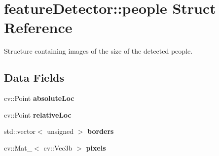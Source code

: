 \hypertarget{structfeatureDetector_1_1people}{
\section{featureDetector::people Struct Reference}
\label{structfeatureDetector_1_1people}
}


Structure containing images of the size of the detected people.  


\subsection*{Data Fields}
\begin{DoxyCompactItemize}
\item 
\hypertarget{structfeatureDetector_1_1people_aba2cb9765825865dcd2da02d3720236c}{
cv::Point {\bfseries absoluteLoc}}
\label{structfeatureDetector_1_1people_aba2cb9765825865dcd2da02d3720236c}

\item 
\hypertarget{structfeatureDetector_1_1people_a6103765384027e5d542246d09ff53abe}{
cv::Point {\bfseries relativeLoc}}
\label{structfeatureDetector_1_1people_a6103765384027e5d542246d09ff53abe}

\item 
\hypertarget{structfeatureDetector_1_1people_af4721aad318f236709a3ed7a1d304657}{
std::vector$<$ unsigned $>$ {\bfseries borders}}
\label{structfeatureDetector_1_1people_af4721aad318f236709a3ed7a1d304657}

\item 
\hypertarget{structfeatureDetector_1_1people_ad5fb2ece8816154ed45459c16e111263}{
cv::Mat\_\-$<$ cv::Vec3b $>$ {\bfseries pixels}}
\label{structfeatureDetector_1_1people_ad5fb2ece8816154ed45459c16e111263}

\end{DoxyCompactItemize}
